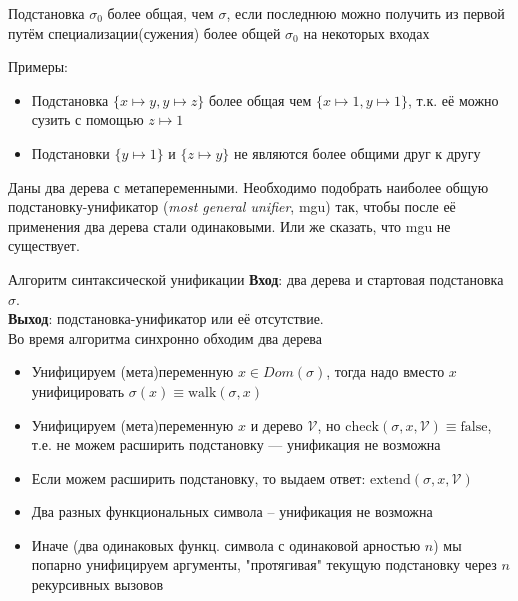 \begin{frame}
\begin{definition}
Подстановка $\sigma_0$ более общая, чем $\sigma$, если последнюю можно получить из первой путём специализации(сужения) более общей $\sigma_0$ на некоторых входах
\end{definition}
\vspace{1em}

Примеры:
\begin{itemize}
\item Подстановка $\{x\mapsto y, y\mapsto z\}$ более общая чем $\{x\mapsto 1, y\mapsto 1\}$, т.к. её можно сузить с помощью $z\mapsto 1$
\item Подстановки $\{y\mapsto 1\}$ и $\{z\mapsto y\}$ не являются более общими друг к другу
\end{itemize}
\end{frame}


\begin{frame}
\begin{definition}
Даны два дерева с метапеременными. Необходимо подобрать наиболее общую подстановку-унификатор (\emph{most general unifier}, mgu) так, чтобы после её применения два дерева стали одинаковыми. Или же сказать, что mgu не существует.
\end{definition}
\end{frame}


\begin{frame}{Алгоритм синтаксической унификации}
\vspace{1em}
\textbf{Вход}: два дерева и стартовая подстановка $\sigma$.\\
\textbf{Выход}: подстановка-унификатор или её отсутствие.\\

Во время алгоритма синхронно обходим два дерева
\begin{itemize}
\item Унифицируем (мета)переменную $x\in Dom(\sigma)$, тогда надо вместо $x$ унифицировать $\sigma(x) \equiv \text{walk}(\sigma, x)$
\item Унифицируем (мета)переменную $x$ и дерево $\mathcal{V}$, но $\text{check}(\sigma,x,\mathcal{V})\equiv \text{false}$, т.е. не можем расширить подстановку  --- унификация не возможна
\item Если можем расширить подстановку, то выдаем ответ: $ \text{extend}(\sigma,x,\mathcal{V})$
\item Два разных функциональных символа -- унификация не возможна 
\item Иначе (два одинаковых функц. символа с одинаковой арностью $n$) мы попарно унифицируем аргументы, "протягивая" текущую подстановку через $n$ рекурсивных вызовов
\end{itemize}

\end{frame}


